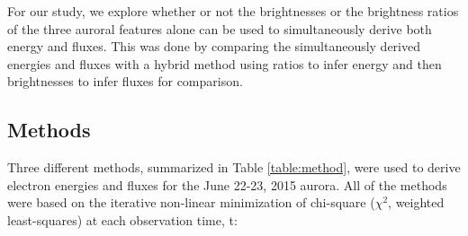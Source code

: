 \documentclass[crop=false,class=mitthesis,oneside,font=12pt]{standalone}
\begin{document}
For our study, we explore whether or not the brightnesses or the brightness ratios of the three auroral features alone can be used to simultaneously derive both energy and fluxes. This was done by comparing the simultaneously derived energies and fluxes with a hybrid method using ratios to infer energy and then brightnesses to infer fluxes for comparison. 



\subsection{Methods}
Three different methods, summarized in Table \ref{table:method}, were used to derive electron energies and fluxes for the June 22-23, 2015 aurora. 
All of the methods were based on the iterative non-linear minimization of chi-square ($\chi^2$, weighted least-squares) at each observation time, t:
\end{document}
